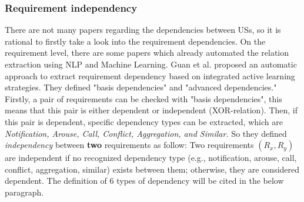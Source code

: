 \documentclass[a4paper, 11 pt, leqno, titlepage = true, toc=bib, oneside]{scrbook}
\begin{document}
\subsubsection{Requirement independency}
There are not many papers regarding the dependencies between USs, so it is rational to firstly take a look into the requirement dependencies. On the requirement level, there are some papers which already automated the relation extraction using NLP and Machine Learning.
Guan et al. \cite{DBLP:journals/ijautcomp/GuanCX24} proposed an automatic approach to extract requirement dependency based on integrated active learning strategies. They defined "basis dependencies" and "advanced dependencies." Firstly, a pair of requirements can be checked with "basis dependencies", this means that this pair is either dependent or independent (XOR-relation). Then, if this pair is dependent, specific dependency types can be extracted, which are \textit{Notification, Arouse, Call, Conflict, Aggregation, and Similar.} So they defined \textit{independency} between \textbf{two} requirements as follow: Two requirements \begin{math}(R_{x}, R_{y})\end{math} are independent if no recognized dependency type (e.g., notification, arouse, call, conflict, aggregation, similar) exists between them; otherwise, they are considered dependent. The definition of 6 types of dependency will be cited in the below paragraph.
\end{document}
